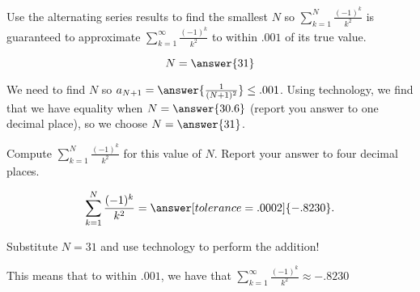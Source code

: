 \documentclass{ximera}
\author{Jim Talamo}
\begin{document}
\begin{exercise}
Use the alternating series results to find the smallest $N$ so $\sum_{k=1}^N \frac{(-1)^k}{k^2}$ is guaranteed to approximate $\sum_{k=1}^\infty \frac{(-1)^k}{k^2}$ to within $.001$ of its true value.  

\[
N = \answer{ 31 } 
\]

\begin{hint}
We need to find $N$ so $a_{N+1} = \answer{\frac{1}{(N+1)^2}} \leq .001$.  Using technology, we find that we have equality when $N=\answer{30.6}$ (report you answer to one decimal place), so we choose $N = \answer{31}$.
\end{hint}

\begin{exercise}
Compute  $\sum_{k=1}^N \frac{(-1)^k}{k^2}$ for this value of $N$.  Report your answer to four decimal places.

\[
\sum_{k=1}^N \frac{(-1)^k}{k^2} = \answer[tolerance=.0002]{-.8230}. 
\]

\begin{hint}
Substitute $N=31$ and use technology to perform the addition!
\end{hint}
\begin{feedback}
This means that to within $.001$, we have that $\sum_{k=1}^\infty \frac{(-1)^k}{k^2} \approx -.8230 $
\end{feedback}
\end{exercise}
\end{exercise}
\end{document}
